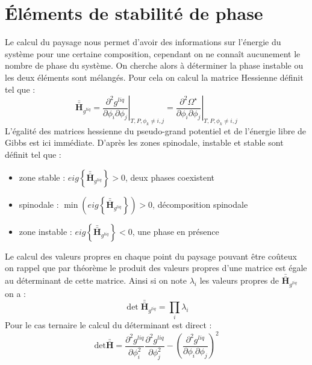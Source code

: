 \documentclass[a4paper,11pt,fleqn]{report}    %
\newcommand{\Mb}{\mathbf}
\newcommand{\doubleoverline}[1]{\bar{\bar{#1}}} 			%
\begin{document}
\section{Éléments de stabilité de phase}
Le calcul du paysage nous permet d'avoir des informations sur l'énergie du système pour une certaine composition, cependant on ne connaît aucunement le nombre de phase du système. On cherche alors à déterminer la phase instable ou les deux éléments sont mélangés. Pour cela on calcul la matrice Hessienne définit tel que : 
\begin{equation}
	\Mb{\doubleoverline{H}}_{g^{liq}} = \left.\frac{\partial^2 g^{liq}}{\partial \phi_i \partial \phi_j}\right|_{T,P,\phi_k\neq i,j}
	=\left.\frac{\partial^2 \Omega^{\star}}{\partial \phi_i \partial \phi_j}\right|_{T,P,\phi_k\neq i,j}
\end{equation}
L'égalité des matrices hessienne du pseudo-grand potentiel et de l'énergie libre de Gibbs est ici immédiate. D'après \cite{aursand_spinodal_2017} les zones spinodale, instable et stable sont définit tel que :
\begin{itemize}
	\item zone stable : $\displaystyle eig\left\{\Mb{\doubleoverline{H}}_{g^{liq}} \right\} > 0$, deux phases coexistent \\ 
	\item spinodale : $\displaystyle \min \left( eig \left\{\Mb{\doubleoverline{H}}_{g^{liq}}\right\} \right) > 0$, décomposition spinodale \\
	\item zone instable : $\displaystyle eig\left\{\Mb{\doubleoverline{H}}_{g^{liq}} \right\} < 0$, une phase en présence \\ 
\end{itemize}
Le calcul des valeurs propres en chaque point du paysage pouvant être coûteux on rappel que par théorème le produit des valeurs propres d'une matrice est égale au déterminant de cette matrice. Ainsi si on note $\lambda_i$ les valeurs propres de $\Mb{\doubleoverline{H}}_{g^{liq}}$ on a :
\begin{equation}
	\det{\Mb{\doubleoverline{H}}_{g^{liq}}} = \prod_i \lambda_i
\end{equation}
Pour le cas ternaire le calcul du déterminant est direct :
\begin{equation}
	\text{det}  \Mb{\doubleoverline{H}}   =  \frac{\partial^2 g^{liq}}{\partial \phi_i^2}
	\frac{\partial^2 g^{liq}}{\partial \phi_j^2}-\left(\frac{\partial^2 g^{liq} }{\partial \phi_i \partial \phi_j} \right)^2
\end{equation}
\end{document}
